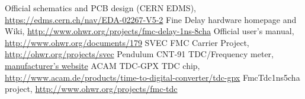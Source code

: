 \documentclass{article}
\begin{document}
\begin{thebibliography}{9}

  Official schematics and PCB design (CERN EDMS), \url{https://edms.cern.ch/nav/EDA-02267-V5-2}
  Fine Delay hardware homepage and Wiki, \url{http://www.ohwr.org/projects/fmc-delay-1ns-8cha}
  Official user's manual, \url{http://www.ohwr.org/documents/179}
  SVEC FMC Carrier Project, \url{http://ohwr.org/projects/svec}
  Pendulum CNT-91 TDC/Frequency meter, \href{http://www.spectracomcorp.com/ProductsServices/TestandMeasurement/FrequencyAnalyzersCounters/CNT9191RTimerCounterAnalyzerCalibrator/tabid/1283/Default.aspx}{manufacturer's website}
  ACAM TDC-GPX TDC chip, \url{http://www.acam.de/products/time-to-digital-converter/tdc-gpx}
  FmcTdc1ns5cha project, \url{http://www.ohwr.org/projects/fmc-tdc}

\end{thebibliography}
\end{document}
